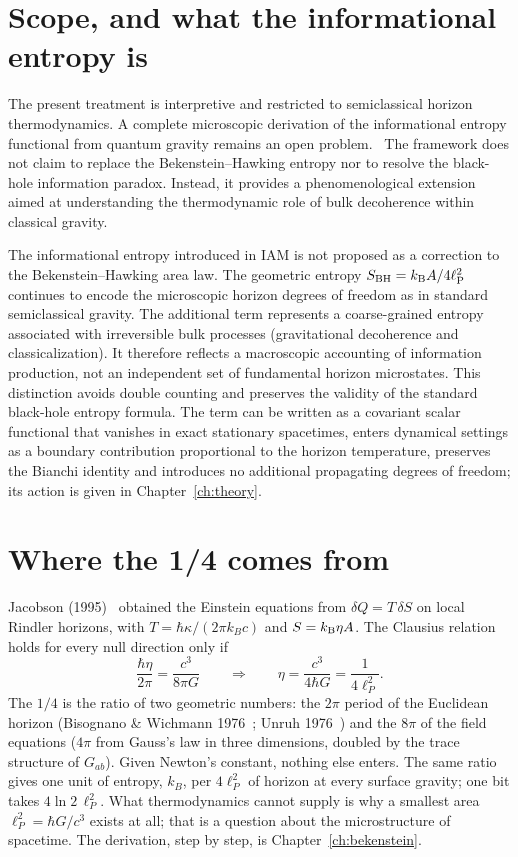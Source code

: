 \section{Scope, and what the informational entropy is}\label{sec:bh_scope}
The present treatment is interpretive and restricted to semiclassical horizon thermodynamics. A complete microscopic derivation of the informational
entropy functional from quantum gravity remains an open problem. \openprob\ The framework does not claim to replace the Bekenstein--Hawking entropy nor to
resolve the black-hole information paradox. Instead, it provides a phenomenological extension aimed at understanding the thermodynamic role of bulk
decoherence within classical gravity.

The informational entropy introduced in IAM is not proposed as a correction to the Bekenstein--Hawking area law. The geometric entropy $S_{\rm BH}=k_{\mathrm B} A/4\ell_{\mathrm P}^2$
continues to encode the microscopic horizon degrees of freedom as in standard semiclassical gravity. The additional term represents a coarse-grained entropy
associated with irreversible bulk processes (gravitational decoherence and classicalization). It therefore reflects a macroscopic accounting of
information production, not an independent set of fundamental horizon microstates. This distinction avoids double counting and preserves the validity of
the standard black-hole entropy formula. The term can be written as a covariant scalar functional that vanishes in exact stationary spacetimes, enters
dynamical settings as a boundary contribution proportional to the horizon temperature, preserves the Bianchi identity and introduces no additional
propagating degrees of freedom; its action is given in Chapter~\ref{ch:theory}. \interp

\section{Where the 1/4 comes from}\label{sec:bh_quarter}
Jacobson (1995)~\cite{Jacobson1995} obtained the Einstein equations from $\delta Q=T\,\delta S$ on local Rindler horizons, with $T=\hbar\kappa/(2\pi k_Bc)$ and $S=k_{\mathrm B}\eta A$. The
Clausius relation holds for every null direction only if
\begin{equation}
\frac{\hbar\eta}{2\pi}=\frac{c^3}{8\pi G}\qquad\Longrightarrow\qquad\eta=\frac{c^3}{4\hbar G}=\frac{1}{4\ell_P^2}.
\end{equation}
The $1/4$ is the ratio of two geometric numbers: the $2\pi$ period of the Euclidean horizon (Bisognano \& Wichmann 1976~\cite{BisognanoWichmann1976}; Unruh 1976~\cite{Unruh1976}) and the $8\pi$ of the
field equations ($4\pi$ from Gauss's law in three dimensions, doubled by the trace structure of $G_{ab}$). Given Newton's constant, nothing else enters.
The same ratio gives one unit of entropy, $k_B$, per $4\ell_P^2$ of horizon at every surface gravity; one bit takes $4\ln2\,\ell_P^2$. What thermodynamics cannot supply is why a smallest area $\ell_P^2=\hbar G/c^3$
exists at all; that is a question about the microstructure of spacetime. The derivation, step by step, is Chapter~\ref{ch:bekenstein}. \derived

